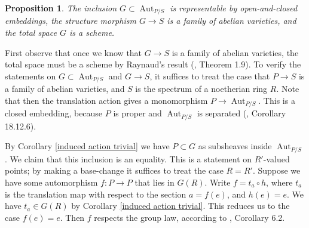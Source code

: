 \documentclass[oneside, 12pt]{amsart}
\newcommand\mylabel[1]{\label{#1}\marginpar{\raggedright\vspace{-1ex}\medskip\medskip\footnotesize \tt #1}}
\renewcommand\mylabel[1]{\label{#1}}
\newtheorem{proposition}[theorem]{Proposition}
\theoremstyle{definition}
\theoremstyle{remark}
\newcommand{\Aut}{\operatorname{Aut}}
\newcommand{\ra}{\rightarrow}
\begin{document}
\begin{proposition}
\label{automorphism group}
\mylabel{inertia abelian}
The  inclusion $G\subset\Aut_{P/S}$ is representable by   open-and-closed embeddings, the structure morphism
$G\ra S$ is a family of abelian varieties, and the total space $G$ is a scheme.
\end{proposition}

\proof
First observe that once we know that $G\ra S$ is a family of abelian varieties, the total space must be a scheme by
Raynaud's result (\cite{Faltings; Chai 1990}, Theorem 1.9).
To verify the statements on $G\subset \Aut_{P/S}$ and $G\ra S$, it suffices to treat  the case that $P\ra S$ is a family of abelian varieties, 
and $S$ is the spectrum of a noetherian ring $R$.
Note that then  the translation action gives a monomorphism $P\ra\Aut_{P/S}$.
This is a closed embedding, because $P$ is proper and $\Aut_{P/S}$ is separated
(\cite{EGA IVd}, Corollary 18.12.6).

By Corollary \ref{induced action trivial}  we have $P\subset G$ as subsheaves inside  $\Aut_{P/S}$.
We claim that this inclusion is an equality.
This is a statement on $R'$-valued points; by making 
a base-change it suffices to treat the case $R=R'$.
Suppose we have some automorphism $f:P\ra P$ that lies in $G(R)$.
Write $f=t_a\circ h$, where   $t_a$ is the translation map with respect to the section
$a=f(e)$, and $h(e)=e$. We have $t_a\in G(R)$ by Corollary \ref{induced action trivial}. This reduces us to the case $f(e)=e$.
Then $f$ respects the group law, according to \cite{Mumford; Fogarty; Kirwan 1993}, Corollary 6.2.
\end{document}
